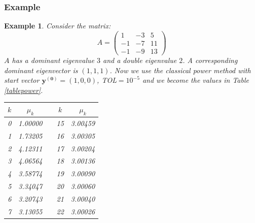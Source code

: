 \documentclass[a4paper,11pt]{report}
\newtheorem{example}[theorem]{Example}
\begin{document}
\subsubsection{Example}
\begin{example}\label{voorbeeldpower}
Consider the matrix:
$$A = \begin{pmatrix}  1 & -3 & 5\\
 -1 & -7 & 11\\
 -1 & -9 & 13
\end{pmatrix}$$
$A$ has a dominant eigenvalue $3$ and a double eigenvalue $2$. A corresponding dominant eigenvector is $(1,1,1)$. 
Now we use the 
classical power method with start vector $\mathbf{y^{(0)}} = (1, 0, 0)$, TOL$= 10^{-5}$ and we 
become the values in Table \ref{tablepower}. 
\begin{table}[h!]
\centering
\begin{tabular}{|r|r|r|r|r|}
\hline
\multicolumn{1}{|c|}{$k$} & \multicolumn{1}{c|}{$\mu_k$} & \multicolumn{1}{c|}{} & \multicolumn{1}{c|}{$k$} & \multicolumn{1}{c|}{$\mu_k$} \\ \hline
0                         & 1.00000                      &                       & 15                       & 3.00459                      \\ \hline
1                         & 1.73205                      &                       & 16                       & 3.00305                      \\ \hline
2                         & 4.12311                      &                       & 17                       & 3.00204                      \\ \hline
3                         & 4.06564                      &                       & 18                       & 3.00136                      \\ \hline
4                         & 3.58774                      &                       & 19                       & 3.00090                      \\ \hline
5                         & 3.34047                      &                       & 20                       & 3.00060                      \\ \hline
6                         & 3.20743                      &                       & 21                       & 3.00040                      \\ \hline
7                         & 3.13055                      &                       & 22                       & 3.00026                      \\ \hline

\end{tabular}
\end{table}
\end{example}
\end{document}
